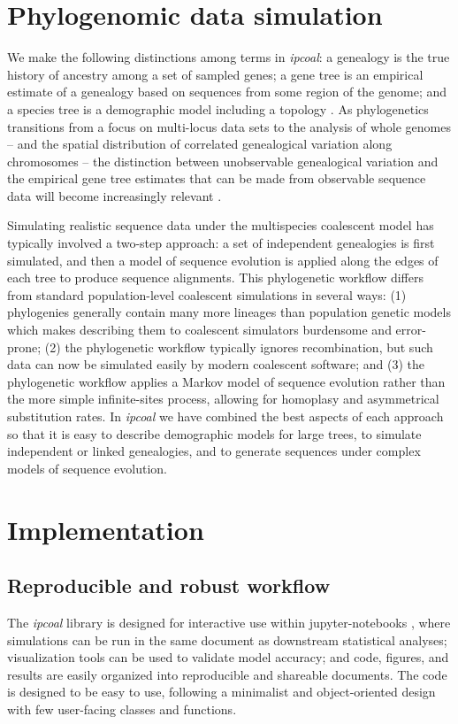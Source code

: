 \documentclass[11pt]{article}
\begin{document}
\section{Phylogenomic data simulation}
We make the following distinctions among terms in \emph{ipcoal}: a genealogy is the true history of ancestry among a set of sampled genes; a gene tree is an empirical estimate of a genealogy based on sequences from some region of the genome; and a species tree is a demographic model including a topology \citep{pamilo_relationships_1988,maddison_gene_1997}. As phylogenetics transitions from a focus on multi-locus data sets \citep{knowles_estimating_2011} to the analysis of whole genomes -- and the spatial distribution of correlated genealogical variation along chromosomes -- the distinction between unobservable genealogical variation and the empirical gene tree estimates that can be made from observable sequence data will become increasingly relevant \citep{posada_recombination_2002,adams_binning_2019}. 

Simulating realistic sequence data under the multispecies coalescent model has typically involved a two-step approach: a set of independent genealogies is first simulated, and then a model of sequence evolution is applied along the edges of each tree to produce sequence alignments. This phylogenetic workflow differs from standard population-level coalescent simulations in several ways: (1) phylogenies generally contain many more lineages than population genetic models which makes describing them to coalescent simulators burdensome and error-prone; (2) the phylogenetic workflow typically ignores recombination, but such data can now be simulated easily by modern coalescent software; and (3) the phylogenetic workflow applies a Markov model of sequence evolution rather than the more simple infinite-sites process, allowing for homoplasy and asymmetrical substitution rates. In \emph{ipcoal} we have combined the best aspects of each approach so that it is easy to describe demographic models for large trees, to simulate independent or linked genealogies, and to generate sequences under complex models of sequence evolution. 

\section{Implementation}
\label{sec:headings}
\subsection{Reproducible and robust workflow}
The \emph{ipcoal} library is designed for interactive use within jupyter-notebooks \citep{kluyver_jupyter_2016}, where simulations can be run in the same document as downstream statistical analyses; visualization tools can be used to validate model accuracy; and code, figures, and results are easily organized into reproducible and shareable documents. The code is designed to be easy to use, following a minimalist and object-oriented design with few user-facing classes and functions.
\end{document}
